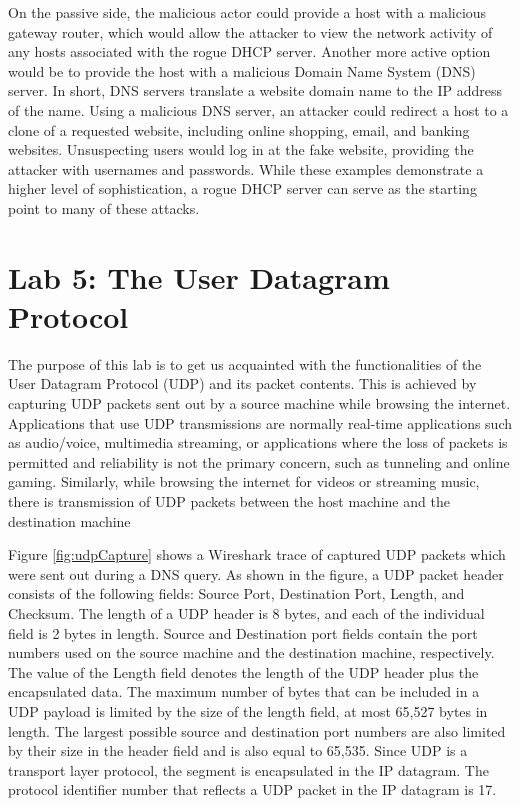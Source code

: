 \documentclass[10pt]{IEEEtran}
\begin{document}
  On the passive side, the malicious actor could provide a host with a malicious gateway router, which would allow the attacker to view the network activity of any hosts associated with the rogue DHCP server. Another more active option would be to provide the host with a malicious Domain Name System (DNS) server.  In short, DNS servers translate a website domain name to the IP address of the name. Using a malicious DNS server, an attacker could redirect a host to a clone of a requested website, including online shopping, email, and banking websites. Unsuspecting users would log in at the fake website, providing the attacker with usernames and passwords. While these examples demonstrate a higher level of sophistication, a rogue DHCP server can serve as the starting point to many of these attacks.\\
 
\section{Lab 5: The User Datagram Protocol}

 The purpose of this lab is to get us acquainted with the functionalities of the User Datagram Protocol (UDP) and its packet contents. This is achieved by capturing  UDP packets sent out by a source machine while browsing the internet. Applications that use UDP transmissions are normally real-time applications such as audio/voice, multimedia streaming, or applications where the loss of packets is permitted and reliability is not the primary concern, such as tunneling and online gaming. Similarly, while browsing the internet for videos or streaming music, there is transmission of UDP packets between the host machine and the destination machine \cite{tanenbaum}
 
 Figure \ref{fig:udpCapture} shows a Wireshark trace of captured UDP packets which were sent out during a DNS query. As shown in the figure, a UDP packet header consists of the following fields: Source Port, Destination Port, Length, and Checksum. The length of a UDP header is 8 bytes, and each of the individual field is 2 bytes in length. Source and Destination port fields contain the port numbers used on the source machine and the destination machine, respectively. The value of the Length field denotes the length of the UDP header plus the encapsulated data. The maximum number of bytes that can be included in a UDP payload is limited by the size of the length field, at most 65,527 bytes in length. The largest possible source and destination port numbers are also limited by their size in the header field and is also equal to 65,535. Since UDP is a transport layer protocol, the segment is encapsulated in the IP datagram. The protocol identifier number that reflects a UDP packet in the IP datagram is 17. \\
\end{document}
